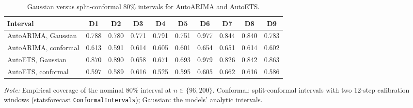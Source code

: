 \begin{table}[!htbp]
\centering
\begin{threeparttable}
\caption{Gaussian versus split-conformal 80\% intervals for AutoARIMA and AutoETS.}
\label{tab:si-conformal}
\small\setlength{\tabcolsep}{4pt}
\begin{tabular}{lccccccccc}
\toprule
Interval & D1 & D2 & D3 & D4 & D5 & D6 & D7 & D8 & D9 \\
\midrule
AutoARIMA, Gaussian & 0.788 & 0.780 & 0.771 & 0.791 & 0.751 & 0.977 & 0.844 & 0.840 & 0.783 \\
AutoARIMA, conformal & 0.613 & 0.591 & 0.614 & 0.605 & 0.601 & 0.654 & 0.651 & 0.614 & 0.602 \\
AutoETS, Gaussian & 0.870 & 0.890 & 0.658 & 0.671 & 0.693 & 0.979 & 0.826 & 0.842 & 0.863 \\
AutoETS, conformal & 0.597 & 0.589 & 0.616 & 0.525 & 0.595 & 0.605 & 0.662 & 0.616 & 0.586 \\
\bottomrule
\end{tabular}
\begin{tablenotes}[flushleft]\footnotesize
\item \textit{Note:} Empirical coverage of the nominal 80\% interval at $n \in \{96, 200\}$. Conformal: split-conformal intervals with two 12-step calibration windows (statsforecast \texttt{ConformalIntervals}); Gaussian: the models' analytic intervals.
\end{tablenotes}
\end{threeparttable}
\end{table}
